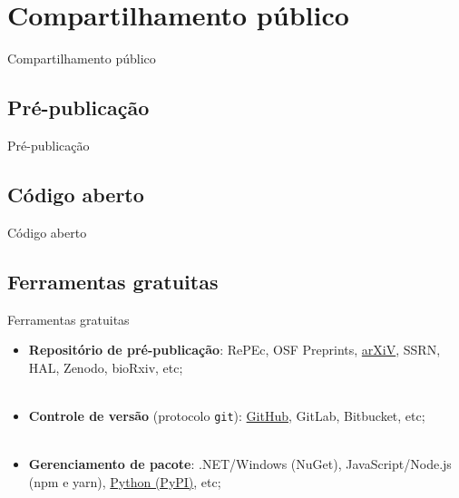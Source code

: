 \section{Compartilhamento público}
\label{s.public_sharing}

\begin{frame}{Compartilhamento público}
\end{frame}

\subsection{Pré-publicação}
\label{ss.research}

\begin{frame}{Pré-publicação}
\end{frame}

\subsection{Código aberto}
\label{ss.integrity}

\begin{frame}{Código aberto}
\end{frame}

\subsection{Ferramentas gratuitas}
\label{ss.free_tools}


\begin{frame}{Ferramentas gratuitas}
	\justify 
	\begin{itemize}
		\item<1> \textbf{Repositório de pré-publicação}: RePEc, OSF Preprints, \underline{arXiV}, SSRN, HAL, Zenodo, bioRxiv, etc;
		\\~\\
		\item<2> \textbf{Controle de versão} (protocolo \texttt{git}): \underline{GitHub}, GitLab, Bitbucket, etc;
		\\~\\
		\item<3> \textbf{Gerenciamento de pacote}: .NET/Windows (NuGet), JavaScript/Node.js (npm e yarn), \underline{Python (PyPI)}, etc;
	\end{itemize}
\end{frame}

